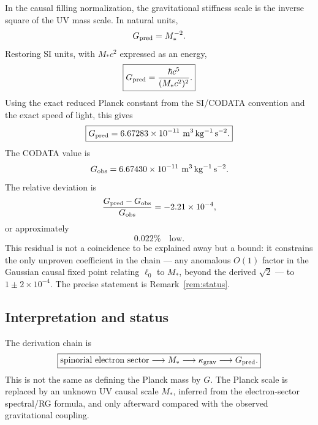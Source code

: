 \documentclass[11pt]{article}
\begin{document}
In the causal filling normalization, the gravitational stiffness scale is the inverse square of the UV mass scale. In natural units,
\begin{equation}
G_{\rm pred}=M_*^{-2}.
\end{equation}
Restoring SI units, with $M_*c^2$ expressed as an energy,
\begin{equation}
\boxed{G_{\rm pred}=\frac{\hbar c^5}{(M_*c^2)^2}.}
\end{equation}
Using the exact reduced Planck constant from the SI/CODATA convention \cite{nist-hbar} and the exact speed of light, this gives
\begin{equation}
\boxed{G_{\rm pred}=6.67283\times10^{-11}\ {\rm m^3\,kg^{-1}\,s^{-2}}.}
\end{equation}
The CODATA value is \cite{nist-g}
\begin{equation}
G_{\rm obs}=6.67430\times10^{-11}\ {\rm m^3\,kg^{-1}\,s^{-2}}.
\end{equation}
The relative deviation is
\begin{equation}
\frac{G_{\rm pred}-G_{\rm obs}}{G_{\rm obs}}
=-2.21\times10^{-4},
\end{equation}
or approximately
\begin{equation}
\boxed{0.022\%\quad\text{low}.}
\end{equation}
This residual is not a coincidence to be explained away but a bound: it constrains the only unproven coefficient in the chain --- any anomalous $O(1)$ factor in the Gaussian causal fixed point relating $\ell_0$ to $M_*$, beyond the derived $\sqrt2$ --- to $1\pm2\times10^{-4}$. The precise statement is Remark~\ref{rem:status}.

\subsection{Interpretation and status}

The derivation chain is
\begin{equation}
\boxed{
\text{spinorial electron sector}
\longrightarrow M_*
\longrightarrow \kappa_{\rm grav}
\longrightarrow G_{\rm pred}.
}
\end{equation}
This is not the same as defining the Planck mass by $G$. The Planck scale is replaced by an unknown UV causal scale $M_*$, inferred from the electron-sector spectral/RG formula, and only afterward compared with the observed gravitational coupling.
\end{document}
